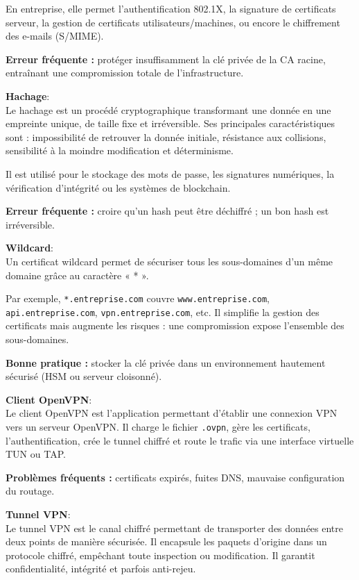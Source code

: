 \noindent En entreprise, elle permet l’authentification 802.1X, la signature de certificats serveur, la gestion de certificats utilisateurs/machines, ou encore le chiffrement des e-mails (S/MIME).

\textbf{Erreur fréquente :} protéger insuffisamment la clé privée de la CA racine, entraînant une compromission totale de l’infrastructure.

\medskip
\noindent \textbf{Hachage}:\\
Le hachage est un procédé cryptographique transformant une donnée en une empreinte unique, de taille fixe et irréversible. Ses principales caractéristiques sont : impossibilité de retrouver la donnée initiale, résistance aux collisions, sensibilité à la moindre modification et déterminisme.

\noindent Il est utilisé pour le stockage des mots de passe, les signatures numériques, la vérification d’intégrité ou les systèmes de blockchain.

\textbf{Erreur fréquente :} croire qu’un hash peut être déchiffré ; un bon hash est irréversible.

\medskip
\noindent \textbf{Wildcard}:\\
Un certificat wildcard permet de sécuriser tous les sous-domaines d’un même domaine grâce au caractère « * ».

\noindent Par exemple, \texttt{*.entreprise.com} couvre \texttt{www.entreprise.com}, \texttt{api.entreprise.com}, \texttt{vpn.entreprise.com}, etc. Il simplifie la gestion des certificats mais augmente les risques : une compromission expose l’ensemble des sous-domaines.

\textbf{Bonne pratique :} stocker la clé privée dans un environnement hautement sécurisé (HSM ou serveur cloisonné).

\medskip
\noindent \textbf{Client OpenVPN}:\\
Le client OpenVPN est l'application permettant d'établir une connexion VPN vers un serveur OpenVPN. Il charge le fichier \texttt{.ovpn}, gère les certificats, l’authentification, crée le tunnel chiffré et route le trafic via une interface virtuelle TUN ou TAP.

\textbf{Problèmes fréquents :} certificats expirés, fuites DNS, mauvaise configuration du routage.

\newpage

\medskip
\noindent \textbf{Tunnel VPN}:\\
Le tunnel VPN est le canal chiffré permettant de transporter des données entre deux points de manière sécurisée. Il encapsule les paquets d’origine dans un protocole chiffré, empêchant toute inspection ou modification. Il garantit confidentialité, intégrité et parfois anti-rejeu.

